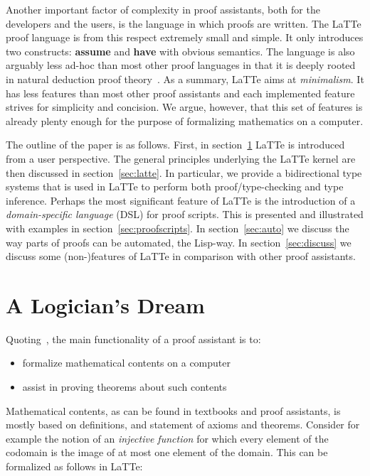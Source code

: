 \documentclass{styles/sig-alternate-05-2015}
\newcommand{\kw}[1]{\textbf{#1}}
\begin{document}
 Another important factor of complexity in proof assistants, both for
 the developers and the users, is the language in which proofs are
 written.  The LaTTe proof language is from this respect extremely
 small and simple. It only introduces two constructs: \kw{assume} and
 \kw{have} with obvious semantics. The language is also arguably less ad-hoc than most other proof
 languages in that it is deeply rooted in natural deduction proof
 theory~\cite{natural-deduc:history}. As a summary, LaTTe aims at \emph{minimalism}. It has less
 features than most other proof assistants and each implemented
 feature strives for simplicity and concision. We argue, however, that
 this set of features is already plenty enough for the purpose of
 formalizing mathematics on a computer.

The outline of the paper is as follows.
First, in section~\ref{sec:related} LaTTe is introduced from a user
perspective. The general principles
underlying the LaTTe kernel are then discussed in section~\ref{sec:latte}.
In particular, we provide a bidirectional type systems that
is used in LaTTe to perform both proof/type-checking and type inference.
Perhaps the most significant feature of LaTTe is the introduction
of a \emph{domain-specific language} (DSL) for proof scripts. This is
presented and illustrated with examples in section~\ref{sec:proofscripts}.
In section~\ref{sec:auto} we discuss the way parts of proofs can be
automated, the Lisp-way. In section~\ref{sec:discuss}
we discuss some (non-)features of LaTTe in comparison with other proof assistants.

\section{A Logician's Dream}
\label{sec:related}

Quoting~\cite{Geuvers2009}, the main functionality of a proof assistant is to:

\begin{itemize}
\item formalize mathematical contents on a computer
\item assist in proving theorems about such contents
\end{itemize}

Mathematical contents, as can be found in textbooks and proof
assistants, is mostly based on definitions, and statement of axioms and
theorems. Consider for example the notion of an \emph{injective
  function} for which every element of the codomain is the image of at most one element of the domain.
This can be formalized as follows in LaTTe:
\end{document}
